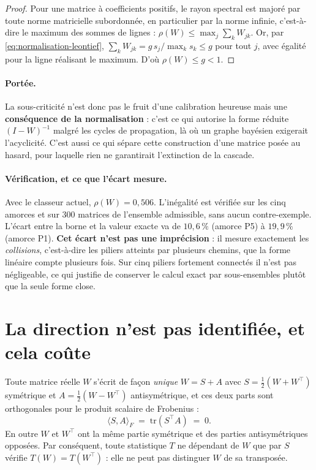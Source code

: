 \begin{proof}
Pour une matrice à coefficients positifs, le rayon spectral est majoré par toute norme
matricielle subordonnée, en particulier par la norme infinie, c'est-à-dire le maximum des sommes
de lignes : $\rho(W)\leq \max_j \sum_k W_{jk}$. Or, par \eqref{eq:normalisation-leontief},
$\sum_k W_{jk} = g\,s_j/\max_k s_k \leq g$ pour tout $j$, avec égalité pour la ligne réalisant
le maximum. D'où $\rho(W)\leq g<1$.
\end{proof}

\paragraph{Portée.} La sous-criticité n'est donc pas le fruit d'une calibration heureuse mais une
\textbf{conséquence de la normalisation} : c'est ce qui autorise la forme réduite $(I-W)^{-1}$
malgré les cycles de propagation, là où un graphe bayésien exigerait l'acyclicité. C'est aussi ce
qui sépare cette construction d'une matrice posée au hasard, pour laquelle rien ne garantirait
l'extinction de la cascade.

\paragraph{Vérification, et ce que l'écart mesure.} Avec le classeur actuel,
$\rho(W) = 0{,}506$. L'inégalité est vérifiée sur les cinq amorces et sur $300$ matrices
de l'ensemble admissible, sans aucun contre-exemple. L'écart entre la borne et la valeur
exacte va de $10{,}6\,\%$ (amorce P5) à $19{,}9\,\%$ (amorce P1). \textbf{Cet écart n'est
pas une imprécision} : il mesure exactement les \emph{collisions}, c'est-à-dire les
piliers atteints par plusieurs chemins, que la forme linéaire compte plusieurs fois.
Sur cinq piliers fortement connectés il n'est pas négligeable, ce qui justifie de
conserver le calcul exact par sous-ensembles plutôt que la seule forme close.

\section{La direction n'est pas identifiée, et cela coûte}

\begin{proposition}\label{prop:decomposition}
Toute matrice réelle $W$ s'écrit de façon \emph{unique} $W = S + A$ avec
$S=\tfrac12(W+W^{\top})$ symétrique et $A=\tfrac12(W-W^{\top})$ antisymétrique, et ces deux
parts sont orthogonales pour le produit scalaire de Frobenius :
\begin{equation}
  \langle S, A\rangle_F \;=\; \mathrm{tr}(S^{\top}A) \;=\; 0 .
  \label{eq:orthogonalite}
\end{equation}
En outre $W$ et $W^{\top}$ ont la même partie symétrique et des parties antisymétriques
opposées. Par conséquent, toute statistique $T$ ne dépendant de $W$ que par $S$ vérifie
$T(W)=T(W^{\top})$ : elle ne peut pas distinguer $W$ de sa transposée.
\end{proposition}

